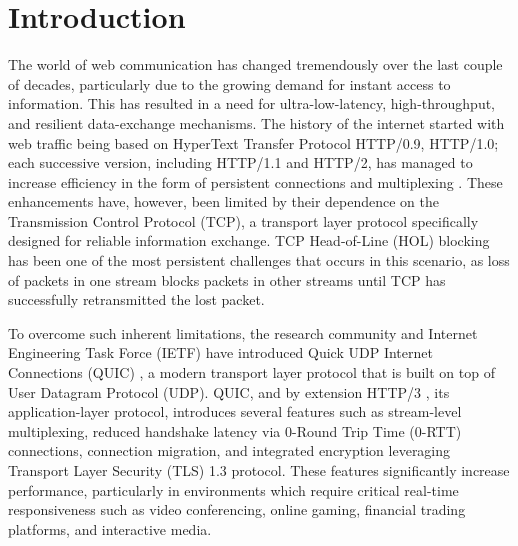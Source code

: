 




\chapter{Introduction}
\label{chap\:Introduction}

The world of web communication has changed tremendously over the last couple of decades, particularly due to the growing demand for instant access to information. This has resulted in a need for ultra-low-latency, high-throughput, and resilient data-exchange mechanisms. The history of the internet started with web traffic being based on HyperText Transfer Protocol HTTP/0.9, HTTP/1.0; each successive version, including HTTP/1.1 and HTTP/2, has managed to increase efficiency in the form of persistent connections and multiplexing \cite{kurose2017}. These enhancements have, however, been limited by their dependence on the Transmission Control Protocol (TCP), a transport layer protocol specifically designed for reliable information exchange. TCP Head-of-Line (HOL) blocking has been one of the most persistent challenges that occurs in this scenario, as loss of packets in one stream blocks packets in other streams until TCP has successfully retransmitted the lost packet.

To overcome such inherent limitations, the research community and Internet Engineering Task Force (IETF) have introduced Quick UDP Internet Connections (QUIC) \cite{rfc9000}, a modern transport layer protocol that is built on top of User Datagram Protocol (UDP). QUIC, and by extension HTTP/3 \cite{rfc9114}, its application-layer protocol, introduces several features such as stream-level multiplexing, reduced handshake latency via 0-Round Trip Time (0-RTT) connections, connection migration, and integrated encryption leveraging Transport Layer Security (TLS) 1.3 protocol. These features significantly increase performance, particularly in environments which require critical real-time responsiveness such as video conferencing, online gaming, financial trading platforms, and interactive media.

